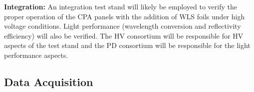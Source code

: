 \textbf{Integration:} An integration test stand will likely be employed to verify the proper operation of the CPA panels with the addition of WLS foils under high voltage conditions. Light performance (wavelength conversion and reflectivity efficiency) will also be verified. The HV consortium will be responsible for HV aspects of the test stand and the PD consortium will be responsible for the light performance aspects.




\subsection{Data Acquisition}
\label{sec:fdsp-pd-intfc-daq}









